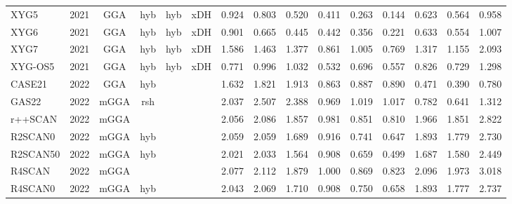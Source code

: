 \begin{landscape}
\begin{longtable}{lc:cccc:rrr:rrr:rrr}
    XYG5             & 2021 & GGA  & hyb      & hyb         & xDH       & 0.924             & 0.803             & 0.520  & 0.411              & 0.263             & 0.144  & 0.623   & 0.564 & 0.958 \\
    XYG6             & 2021 & GGA  & hyb      & hyb         & xDH       & 0.901             & 0.665             & 0.445  & 0.442              & 0.356             & 0.221  & 0.633   & 0.554 & 1.007 \\
    XYG7             & 2021 & GGA  & hyb      & hyb         & xDH       & 1.586             & 1.463             & 1.377  & 0.861              & 1.005             & 0.769  & 1.317   & 1.155 & 2.093 \\
    XYG-OS5          & 2021 & GGA  & hyb      & hyb         & xDH       & 0.771             & 0.996             & 1.032  & 0.532              & 0.696             & 0.557  & 0.826   & 0.729 & 1.298 \\
    CASE21           & 2022 & GGA  & hyb      &             &           & 1.632             & 1.821             & 1.913  & 0.863              & 0.887             & 0.890  & 0.471   & 0.390 & 0.780 \\
    GAS22            & 2022 & mGGA & rsh      &             &           & 2.037             & 2.507             & 2.388  & 0.969              & 1.019             & 1.017  & 0.782   & 0.641 & 1.312 \\
    r++SCAN          & 2022 & mGGA &          &             &           & 2.056             & 2.086             & 1.857  & 0.981              & 0.851             & 0.810  & 1.966   & 1.851 & 2.822 \\
    R2SCAN0          & 2022 & mGGA & hyb      &             &           & 2.059             & 2.059             & 1.689  & 0.916              & 0.741             & 0.647  & 1.893   & 1.779 & 2.730 \\
    R2SCAN50         & 2022 & mGGA & hyb      &             &           & 2.021             & 2.033             & 1.564  & 0.908              & 0.659             & 0.499  & 1.687   & 1.580 & 2.449 \\
    R4SCAN           & 2022 & mGGA &          &             &           & 2.077             & 2.112             & 1.879  & 1.000              & 0.869             & 0.823  & 2.096   & 1.973 & 3.018 \\
    R4SCAN0          & 2022 & mGGA & hyb      &             &           & 2.043             & 2.069             & 1.710  & 0.908              & 0.750             & 0.658  & 1.893   & 1.777 & 2.737
\end{longtable}

\end{landscape}
